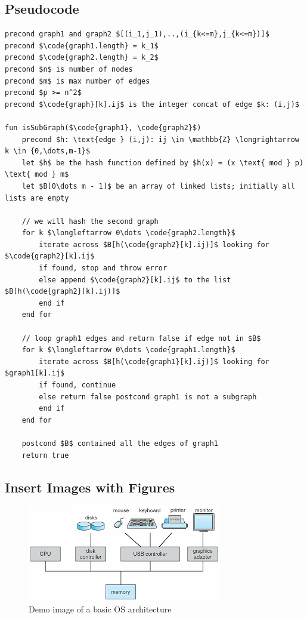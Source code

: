 \documentclass[12pt, dvipsnames, a4paper]{article}
\newcommand{\code}[1]{\texttt{#1}}
\begin{document}
\subsection{Pseudocode}
\begin{lstlisting}[frame=single, basicstyle=\small]
precond graph1 and graph2 $[(i_1,j_1),..,(i_{k<=m},j_{k<=m})]$
precond $\code{graph1.length} = k_1$
precond $\code{graph2.length} = k_2$
precond $n$ is number of nodes
precond $m$ is max number of edges
precond $p >= n^2$
precond $\code{graph}[k].ij$ is the integer concat of edge $k: (i,j)$

fun isSubGraph($\code{graph1}, \code{graph2}$)
	precond $h: \text{edge } (i,j): ij \in \mathbb{Z} \longrightarrow k \in {0,\dots,m-1}$
	let $h$ be the hash function defined by $h(x) = (x \text{ mod } p) \text{ mod } m$
	let $B[0\dots m - 1]$ be an array of linked lists; initially all lists are empty
	
	// we will hash the second graph
	for k $\longleftarrow 0\dots \code{graph2.length}$	
		iterate across $B[h(\code{graph2}[k].ij)]$ looking for $\code{graph2}[k].ij$
 		if found, stop and throw error
		else append $\code{graph2}[k].ij$ to the list $B[h(\code{graph2}[k].ij)]$
 		end if
	end for

	// loop graph1 edges and return false if edge not in $B$
	for k $\longleftarrow 0\dots \code{graph1.length}$	
		iterate across $B[h(\code{graph1}[k].ij)]$ looking for $graph1[k].ij$
 		if found, continue
		else return false postcond graph1 is not a subgraph
 		end if
	end for

	postcond $B$ contained all the edges of graph1	
	return true
\end{lstlisting}
\clearpage
\subsection{Insert Images with Figures}
\begin{figure}[hbt!]
	\caption{Demo image of a basic OS architecture}
	\includegraphics[scale=.8]{assets/demo.png}
	\centering
\end{figure}
\end{document}
